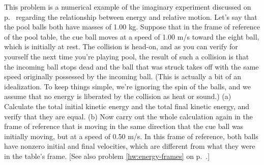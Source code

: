 This problem is a numerical example of the imaginary
experiment discussed on p.~\pageref{galilean-energy} regarding the
relationship between energy and relative motion. Let's say
that the pool balls both have masses of 1.00 kg. Suppose
that in the frame of reference of the pool table, the cue
ball moves at a speed of 1.00 m/s toward the eight ball,
which is initially at rest. The collision is head-on, and as
you can verify for yourself the next time you're playing
pool, the result of such a collision is that the incoming
ball stops dead and the ball that was struck takes off with
the same speed originally possessed by the incoming ball.
(This is actually a bit of an idealization. To keep things
simple, we're ignoring the spin of the balls, and we assume
that no energy is liberated by the collision as heat or
sound.) (a) Calculate the total initial kinetic energy and
the total final kinetic energy, and verify that they are
equal. (b) Now carry out the whole calculation again in the
frame of reference that is moving in the same direction that
the cue ball was initially moving, but at a speed of 0.50
m/s. In this frame of reference, both balls have nonzero
initial and final velocities, which are different from what
they were in the table's frame. [See also problem
\ref{hw:energy-frames} on p.~\pageref{hw:energy-frames}.]
